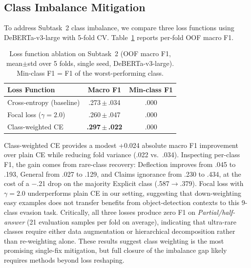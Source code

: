 \documentclass[11pt]{article}
\begin{document}
\subsection{Class Imbalance Mitigation}
\label{sec:imbalance}

To address Subtask~2 class imbalance, we compare three loss functions using DeBERTa-v3-large with 5-fold CV. Table~\ref{tab:loss_ablation} reports per-fold OOF macro F1.

\begin{table}[H]
\centering
\small
\begin{tabular}{@{}lcc@{}}
\toprule
\textbf{Loss Function} & \textbf{Macro F1} & \textbf{Min-class F1} \\
\midrule
Cross-entropy (baseline) & .273\,$\pm$\,.034 & .000 \\
Focal loss ($\gamma{=}2.0$) & .260\,$\pm$\,.047 & .000 \\
Class-weighted CE & \textbf{.297\,$\pm$\,.022} & .000 \\
\bottomrule
\end{tabular}
\caption{Loss function ablation on Subtask~2 (OOF macro F1, mean$\pm$std over 5 folds, single seed, DeBERTa-v3-large). Min-class F1 = F1 of the worst-performing class.}
\label{tab:loss_ablation}
\end{table}

Class-weighted CE provides a modest +0.024 absolute macro F1 improvement over plain CE while reducing fold variance (.022 vs.\ .034). Inspecting per-class F1, the gain comes from rare-class recovery: Deflection improves from .045 to .193, General from .027 to .129, and Claims ignorance from .230 to .434, at the cost of a $-$.21 drop on the majority Explicit class (.587$\rightarrow$.379). Focal loss with $\gamma{=}2.0$ underperforms plain CE in our setting, suggesting that down-weighting easy examples does not transfer benefits from object-detection contexts to this 9-class evasion task. Critically, all three losses produce zero F1 on \emph{Partial/half-answer} (21 evaluation samples per fold on average), indicating that ultra-rare classes require either data augmentation or hierarchical decomposition rather than re-weighting alone. These results suggest class weighting is the most promising single-fix mitigation, but full closure of the imbalance gap likely requires methods beyond loss reshaping.
\end{document}
